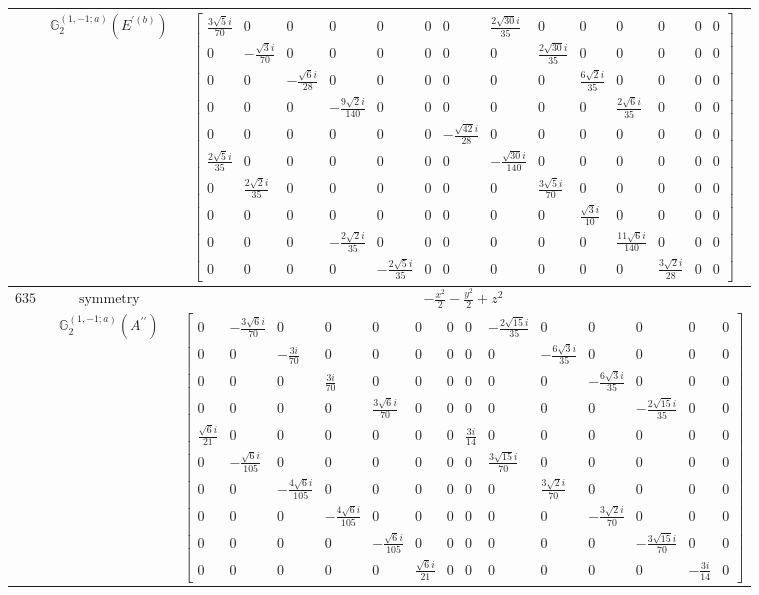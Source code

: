 \documentclass[fleqn,8pt,landscape]{jsarticle}
\begin{document}
\begin{longtable}{ccc}
$  $ & $ \mathbb{G}_{2}^{(1,-1;a)}(E^{\prime(b)}) $ & $ \begin{bmatrix} \frac{3 \sqrt{5} i}{70} & 0 & 0 & 0 & 0 & 0 & 0 & \frac{2 \sqrt{30} i}{35} & 0 & 0 & 0 & 0 & 0 & 0 \\ 0 & - \frac{\sqrt{3} i}{70} & 0 & 0 & 0 & 0 & 0 & 0 & \frac{2 \sqrt{30} i}{35} & 0 & 0 & 0 & 0 & 0 \\ 0 & 0 & - \frac{\sqrt{6} i}{28} & 0 & 0 & 0 & 0 & 0 & 0 & \frac{6 \sqrt{2} i}{35} & 0 & 0 & 0 & 0 \\ 0 & 0 & 0 & - \frac{9 \sqrt{2} i}{140} & 0 & 0 & 0 & 0 & 0 & 0 & \frac{2 \sqrt{6} i}{35} & 0 & 0 & 0 \\ 0 & 0 & 0 & 0 & 0 & 0 & - \frac{\sqrt{42} i}{28} & 0 & 0 & 0 & 0 & 0 & 0 & 0 \\ \frac{2 \sqrt{5} i}{35} & 0 & 0 & 0 & 0 & 0 & 0 & - \frac{\sqrt{30} i}{140} & 0 & 0 & 0 & 0 & 0 & 0 \\ 0 & \frac{2 \sqrt{2} i}{35} & 0 & 0 & 0 & 0 & 0 & 0 & \frac{3 \sqrt{5} i}{70} & 0 & 0 & 0 & 0 & 0 \\ 0 & 0 & 0 & 0 & 0 & 0 & 0 & 0 & 0 & \frac{\sqrt{3} i}{10} & 0 & 0 & 0 & 0 \\ 0 & 0 & 0 & - \frac{2 \sqrt{2} i}{35} & 0 & 0 & 0 & 0 & 0 & 0 & \frac{11 \sqrt{6} i}{140} & 0 & 0 & 0 \\ 0 & 0 & 0 & 0 & - \frac{2 \sqrt{5} i}{35} & 0 & 0 & 0 & 0 & 0 & 0 & \frac{3 \sqrt{2} i}{28} & 0 & 0 \end{bmatrix} $ \\ \hline
$ 635 $ & $ \text{symmetry} $ & $ - \frac{x^{2}}{2} - \frac{y^{2}}{2} + z^{2} $ \\
$  $ & $ \mathbb{G}_{2}^{(1,-1;a)}(A^{\prime\prime}) $ & $ \begin{bmatrix} 0 & - \frac{3 \sqrt{6} i}{70} & 0 & 0 & 0 & 0 & 0 & 0 & - \frac{2 \sqrt{15} i}{35} & 0 & 0 & 0 & 0 & 0 \\ 0 & 0 & - \frac{3 i}{70} & 0 & 0 & 0 & 0 & 0 & 0 & - \frac{6 \sqrt{3} i}{35} & 0 & 0 & 0 & 0 \\ 0 & 0 & 0 & \frac{3 i}{70} & 0 & 0 & 0 & 0 & 0 & 0 & - \frac{6 \sqrt{3} i}{35} & 0 & 0 & 0 \\ 0 & 0 & 0 & 0 & \frac{3 \sqrt{6} i}{70} & 0 & 0 & 0 & 0 & 0 & 0 & - \frac{2 \sqrt{15} i}{35} & 0 & 0 \\ \frac{\sqrt{6} i}{21} & 0 & 0 & 0 & 0 & 0 & 0 & \frac{3 i}{14} & 0 & 0 & 0 & 0 & 0 & 0 \\ 0 & - \frac{\sqrt{6} i}{105} & 0 & 0 & 0 & 0 & 0 & 0 & \frac{3 \sqrt{15} i}{70} & 0 & 0 & 0 & 0 & 0 \\ 0 & 0 & - \frac{4 \sqrt{6} i}{105} & 0 & 0 & 0 & 0 & 0 & 0 & \frac{3 \sqrt{2} i}{70} & 0 & 0 & 0 & 0 \\ 0 & 0 & 0 & - \frac{4 \sqrt{6} i}{105} & 0 & 0 & 0 & 0 & 0 & 0 & - \frac{3 \sqrt{2} i}{70} & 0 & 0 & 0 \\ 0 & 0 & 0 & 0 & - \frac{\sqrt{6} i}{105} & 0 & 0 & 0 & 0 & 0 & 0 & - \frac{3 \sqrt{15} i}{70} & 0 & 0 \\ 0 & 0 & 0 & 0 & 0 & \frac{\sqrt{6} i}{21} & 0 & 0 & 0 & 0 & 0 & 0 & - \frac{3 i}{14} & 0 \end{bmatrix} $ \\ \hline

\end{longtable}
\end{document}
